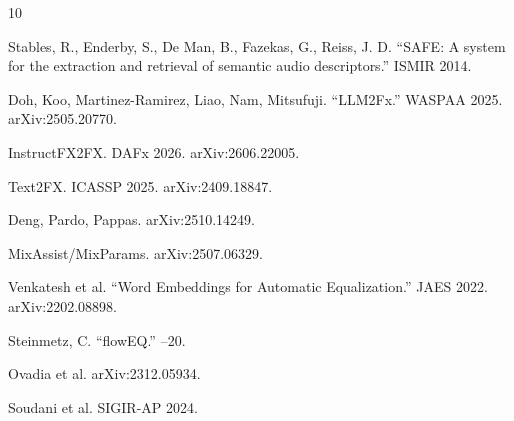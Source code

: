 \documentclass[11pt]{article}
\begin{document}
\begin{thebibliography}{10}

Stables, R., Enderby, S., De Man, B., Fazekas, G., Reiss, J. D.
\newblock ``SAFE: A system for the extraction and retrieval of semantic audio descriptors.''
\newblock ISMIR 2014.

Doh, Koo, Martinez-Ramirez, Liao, Nam, Mitsufuji.
\newblock ``LLM2Fx.''
\newblock WASPAA 2025. arXiv:2505.20770.

InstructFX2FX.
\newblock DAFx 2026. arXiv:2606.22005.

Text2FX.
\newblock ICASSP 2025. arXiv:2409.18847.

Deng, Pardo, Pappas.
\newblock arXiv:2510.14249.

MixAssist/MixParams.
\newblock arXiv:2507.06329.

Venkatesh et al.
\newblock ``Word Embeddings for Automatic Equalization.''
\newblock JAES 2022. arXiv:2202.08898.

Steinmetz, C.
\newblock ``flowEQ.''
--20.

Ovadia et al.
\newblock arXiv:2312.05934.

Soudani et al.
\newblock SIGIR-AP 2024.

\end{thebibliography}
\end{document}
